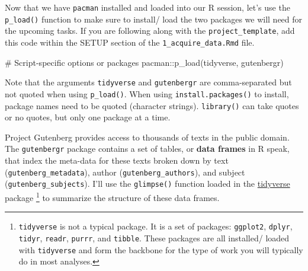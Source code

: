\documentclass[
  letterpaper,
]{latex/krantz}
\newenvironment{Shaded}{\begin{snugshade}}{\end{snugshade}}
\newcommand{\CommentTok}[1]{\textcolor[rgb]{0.37,0.37,0.37}{#1}}
\newcommand{\FunctionTok}[1]{\textcolor[rgb]{0.28,0.35,0.67}{#1}}
\newcommand{\NormalTok}[1]{\textcolor[rgb]{0.00,0.23,0.31}{#1}}
\newcommand{\SpecialCharTok}[1]{\textcolor[rgb]{0.37,0.37,0.37}{#1}}
\begin{document}
Now that we have \texttt{pacman} installed and loaded into our R
session, let's use the \texttt{p\_load()} function to make sure to
install/ load the two packages we will need for the upcoming tasks. If
you are following along with the \texttt{project\_template}, add this
code within the SETUP section of the \texttt{1\_acquire\_data.Rmd} file.

\begin{Shaded}
\begin{Highlighting}[]
\CommentTok{\# Script{-}specific options or packages}
\NormalTok{pacman}\SpecialCharTok{::}\FunctionTok{p\_load}\NormalTok{(tidyverse, gutenbergr)}
\end{Highlighting}
\end{Shaded}

\begin{tcolorbox}[enhanced jigsaw, toprule=.15mm, bottomtitle=1mm, coltitle=black, title=\textcolor{quarto-callout-warning-color}{\faExclamationTriangle}\hspace{0.5em}{Tip}, left=2mm, colframe=quarto-callout-warning-color-frame, bottomrule=.15mm, colbacktitle=quarto-callout-warning-color!10!white, leftrule=.75mm, colback=white, titlerule=0mm, breakable, toptitle=1mm, opacityback=0, arc=.35mm, rightrule=.15mm, opacitybacktitle=0.6]

Note that the arguments \texttt{tidyverse} and \texttt{gutenbergr} are
comma-separated but not quoted when using \texttt{p\_load()}. When using
\texttt{install.packages()} to install, package names need to be quoted
(character strings). \texttt{library()} can take quotes or no quotes,
but only one package at a time.

\end{tcolorbox}

Project Gutenberg provides access to thousands of texts in the public
domain. The \texttt{gutenbergr} package contains a set of tables, or
\textbf{data frames} in R speak, that index the meta-data for these
texts broken down by text (\texttt{gutenberg\_metadata}), author
(\texttt{gutenberg\_authors}), and subject
(\texttt{gutenberg\_subjects}). I'll use the \texttt{glimpse()} function
loaded in the
\href{https://CRAN.R-project.org/package=tidyverse}{tidyverse} package
\footnote{\texttt{tidyverse} is not a typical package. It is a set of
  packages: \texttt{ggplot2}, \texttt{dplyr}, \texttt{tidyr},
  \texttt{readr}, \texttt{purrr}, and \texttt{tibble}. These packages
  are all installed/ loaded with \texttt{tidyverse} and form the
  backbone for the type of work you will typically do in most analyses.}
to summarize the structure of these data frames.
\end{document}
